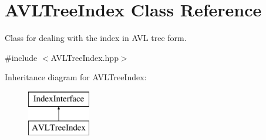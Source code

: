 \hypertarget{class_a_v_l_tree_index}{}\section{A\+V\+L\+Tree\+Index Class Reference}
\label{class_a_v_l_tree_index}


Class for dealing with the index in A\+V\+L tree form.  




{\ttfamily \#include $<$A\+V\+L\+Tree\+Index.\+hpp$>$}

Inheritance diagram for A\+V\+L\+Tree\+Index\+:\begin{figure}[H]
\begin{center}
\leavevmode
\includegraphics[height=2.000000cm]{class_a_v_l_tree_index}
\end{center}
\end{figure}
